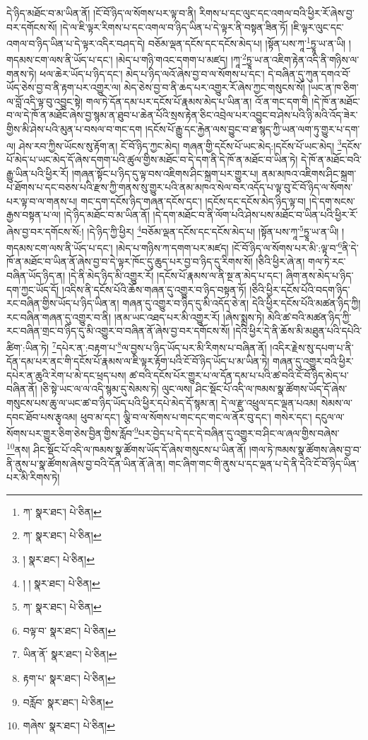 དེ་ཉིད་མཐོང་བ་མ་ཡིན་ནོ། །ངོ་བོ་ཉིད་ལ་སོགས་པར་ལྟ་བ་ནི། རིགས་པ་དང་ལུང་དང་འགལ་བའི་ཕྱིར་རོ་ཞེས་བྱ་བར་དགོངས་སོ། །དེ་ལ་ཇི་ལྟར་རིགས་པ་དང་འགལ་བ་ཉིད་ཡིན་པ་དེ་ལྟར་ནི་བསྟན་ཟིན་ཏོ། །ཇི་ལྟར་ལུང་དང་འགལ་བ་ཉིད་ཡིན་པ་དེ་ལྟར་འདིར་བཤད་དེ། བཅོམ་ལྡན་དངོས་དང་དངོས་མེད་པ། །སྟོན་པས་ཀཱ་\footnote{ཀ་  སྣར་ཐང་།  པེ་ཅིན། }ཏྱཱ་ཡ་ན་ཡི། །གདམས་ངག་ལས་ནི་ཡོད་པ་དང་། །མེད་པ་གཉི་གའང་དགག་པ་མཛད། །ཀཱ་\footnote{ཀ་  སྣར་ཐང་།  པེ་ཅིན། }ཏྱཱ་ཡ་ན་འཇིག་རྟེན་འདི་ནི་གཉིས་ལ་གནས་ཏེ། ཕལ་ཆེར་ཡོད་པ་ཉིད་དང་། མེད་པ་ཉིད་ལའོ་ཞེས་བྱ་བ་ལ་སོགས་པ་དང་། དེ་བཞིན་དུ་ཀུན་དགའ་བོ་ཡོད་ཅེས་བྱ་བ་ནི་རྟག་པར་འགྱུར་ལ། མེད་ཅེས་བྱ་བ་ནི་ཆད་པར་འགྱུར་རོ་ཞེས་ཀྱང་གསུངས་སོ། །ཡང་ན་ཁ་ཅིག་ལ་བློ་འདི་ལྟ་བུ་འབྱུང་སྟེ། གལ་ཏེ་དོན་དམ་པར་དངོས་པོ་རྣམས་མེད་པ་ཡིན་ན། འོ་ན་གང་དག་གི །དེ་ཁོ་ན་མཐོང་བ་ལ་དེ་ཁོ་ན་མཐོང་ཞེས་བྱ་སྙམ་ན་ཐུབ་པ་ཆེན་པོའི་སྲས་རྟེན་ཅིང་འབྲེལ་པར་འབྱུང་བ་ཤེས་པའི་ཉི་མའི་འོད་ཟེར་གྱིས་མི་ཤེས་པའི་མུན་པ་བསལ་བ་གང་དག །དངོས་པོ་རྒྱུ་དང་རྐྱེན་ལས་བྱུང་བ་ཐ་སྙད་ཀྱི་ཡན་ལག་ཏུ་གྱུར་པ་དག་ལ། ཤེས་རབ་ཀྱིས་ཡོངས་སུ་རྟོག་ན། ངོ་བོ་ཉིད་ཀྱང་མེད། གཞན་གྱི་དངོས་པོ་ཡང་མེད:།དངོས་པོ་ཡང་མེད། \footnote{།   སྣར་ཐང་།  པེ་ཅིན། }དངོས་པོ་མེད་པ་ཡང་མེད་དོ་ཞེས་དགག་པའི་ཚུལ་གྱིས་མཐོང་བ་དེ་དག་ནི་དེ་ཁོ་ན་མཐོང་བ་ཡིན་ཏེ། དེ་ཁོ་ན་མཐོང་བའི་རྒྱུ་ཡིན་པའི་ཕྱིར་རོ། །གཞན་སྟོང་པ་ཉིད་དུ་ལྟ་བས་འཇིགས་ཤིང་སྐྲག་པར་གྱུར་པ། ནམ་མཁའ་འཇིགས་ཤིང་སྐྲག་པ་ཐོགས་པ་དང་བཅས་པའི་རྫས་ཀྱི་གནས་སུ་གྱུར་པའི་ནམ་མཁའ་སེལ་བར་འདོད་པ་ལྟ་བུ་ངོ་བོ་ཉིད་ལ་སོགས་པར་ལྟ་བ་ལ་གནས་པ། གང་དག་དངོས་ཉིད་གཞན་དངོས་དང་། །དངོས་དང་དངོས་མེད་ཉིད་ལྟ་བ། །དེ་དག་སངས་རྒྱས་བསྟན་པ་ལ། །དེ་ཉིད་མཐོང་བ་མ་ཡིན་ནོ། །དེ་དག་མཐོང་བ་ནི་ལོག་པའི་ཤེས་པས་མཐོང་བ་ཡིན་པའི་ཕྱིར་རོ་ཞེས་བྱ་བར་དགོངས་སོ:། །དེ་ཉིད་ཀྱི་ཕྱིར། \footnote{། །   སྣར་ཐང་།  པེ་ཅིན། }བཅོམ་ལྡན་དངོས་དང་དངོས་མེད་པ། །སྟོན་པས་ཀཱ་\footnote{ཀ་  སྣར་ཐང་།  པེ་ཅིན། }ཏྱཱ་ཡ་ན་ཡི། །གདམས་ངག་ལས་ནི་ཡོད་པ་དང་། །མེད་པ་གཉིས་ཀ་དགག་པར་མཛད། །ངོ་བོ་ཉིད་ལ་སོགས་པར་མི་:ལྟ་བ་\footnote{བལྟ་བ་  སྣར་ཐང་།  པེ་ཅིན། }ནི་དེ་ཁོ་ན་མཐོང་བ་ཡིན་ནོ་ཞེས་བྱ་བ་དེ་ལྟར་ཁོང་དུ་ཆུད་པར་བྱ་བ་ཉིད་དུ་རིགས་སོ། །ཅིའི་ཕྱིར་ཞེ་ན། གལ་ཏེ་རང་བཞིན་ཡོད་ཉིད་ན། །དེ་ནི་མེད་ཉིད་མི་འགྱུར་རོ། །དངོས་པོ་རྣམས་ལ་ནི་སྔ་ན་མེད་པ་དང་། ཞིག་ནས་མེད་པ་ཉིད་དག་ཀྱང་ཡོད་དོ། །འདིས་ནི་དངོས་པོའི་ཆོས་གཞན་དུ་འགྱུར་བ་ཉིད་བསྟན་ཏོ། །ཅིའི་ཕྱིར་དངོས་པོའི་བདག་ཉིད་རང་བཞིན་གྱིས་ཡོད་པ་ཉིད་ཡིན་ན། གཞན་དུ་འགྱུར་བ་ཉིད་དུ་མི་འདོད་ཅེ་ན། དེའི་ཕྱིར་དངོས་པོའི་མཚན་ཉིད་ཀྱི། རང་བཞིན་གཞན་དུ་འགྱུར་བ་ནི། །ནམ་ཡང་འཐད་པར་མི་འགྱུར་རོ། །ཞེས་སྨྲས་ཏེ། མེའི་ཚ་བའི་མཚན་ཉིད་ཀྱི་རང་བཞིན་གྲང་བ་ཉིད་དུ་མི་འགྱུར་བ་བཞིན་ནོ་ཞེས་བྱ་བར་དགོངས་སོ། །དེའི་ཕྱིར་དེ་ནི་ཆོས་མི་མཐུན་པའི་དཔེའི་ཚིག་:ཡིན་ཏེ། \footnote{ཡིན་ནོ་  སྣར་ཐང་།  པེ་ཅིན། }དཔེར་ན་:བརྟག་པ་\footnote{རྟག་པ་  སྣར་ཐང་།  པེ་ཅིན། }ལ་བྱས་པ་ཉིད་ཡོད་པར་མི་རིགས་པ་བཞིན་ནོ། །འདིར་རྗེས་སུ་དཔག་པ་ནི་དོན་དམ་པར་ནང་གི་དངོས་པོ་རྣམས་ལ་ཇི་ལྟར་རྟོག་པའི་ངོ་བོ་ཉིད་ཡོད་པ་མ་ཡིན་ཏེ། གཞན་དུ་འགྱུར་བའི་ཕྱིར་དཔེར་ན་ཆུའི་རེག་པ་མེ་དང་ཕྲད་པས། ཚ་བའི་དངོས་པོར་གྱུར་པ་ལ་དོན་དམ་པ་པའི་ཚ་བའི་ངོ་བོ་ཉིད་མེད་པ་བཞིན་ནོ། །ཅི་སྟེ་ཡང་ལ་ལ་འདི་སྙམ་དུ་སེམས་ཏེ། ལུང་ལས། ཤིང་སྡོང་པོ་འདི་ལ་ཁམས་སྣ་ཚོགས་ཡོད་དོ་ཞེས་གསུངས་པས་ཆུ་ལ་ཡང་ཚ་བ་ཉིད་ཡོད་པའི་ཕྱིར་དཔེ་མེད་དོ་སྙམ་ན། དེ་ལ་རྫུ་འཕྲུལ་དང་ལྡན་པའམ། སེམས་ལ་དབང་ཐོབ་པས་རྩྭའམ། ཕུབ་མ་དང་། ལྕི་བ་ལ་སོགས་པ་གང་དང་གང་ལ་ནོར་བུ་དང་། གསེར་དང་། དངུལ་ལ་སོགས་པར་གྱུར་ཅིག་ཅེས་བྱིན་གྱིས་རློབ་\footnote{བརློབ་  སྣར་ཐང་།  པེ་ཅིན། }པར་བྱེད་པ་དེ་དང་དེ་བཞིན་དུ་འགྱུར་བ་ཤིང་ལ་ཞལ་གྱིས་བཞེས་\footnote{གཞེས་  སྣར་ཐང་།  པེ་ཅིན། }ནས། ཤིང་སྡོང་པོ་འདི་ལ་ཁམས་སྣ་ཚོགས་ཡོད་དོ་ཞེས་གསུངས་པ་ཡིན་ནོ། །གལ་ཏེ་ཁམས་སྣ་ཚོགས་ཞེས་བྱ་བ་ནི་ནུས་པ་སྣ་ཚོགས་ཞེས་བྱ་བའི་དོན་ཡིན་ནོ་ཞེ་ན། གང་ཞིག་གང་གི་ནུས་པ་དང་ལྡན་པ་དེ་ནི་དེའི་ངོ་བོ་ཉིད་ཡིན་པར་མི་རིགས་ཏེ། 